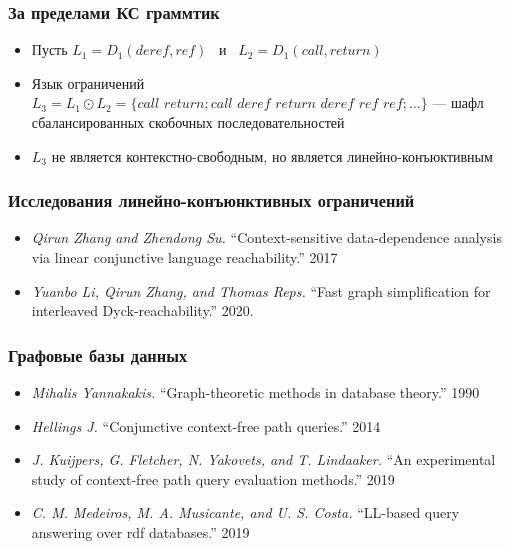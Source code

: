 \documentclass{beamer}
\begin{document}
\begin{frame}[fragile]
  
  \frametitle{За пределами КС граммтик}
  \begin{itemize}
      \item Пусть $L_1 = D_1(\textit{deref}, \textit{ref}) $  \ и \ $ L_2 = D_1(\textit{call}, \textit{return})$ 
      \item Язык ограничений $L_3 = L_1 \odot L_2 = \{\textit{call return}; \textit{call deref return deref ref ref};  \dots\}$ --- шафл сбалансированных скобочных последовательностей
      \item $L_3$ не является контекстно-свободным, но является линейно-конъюктивным
    \end{itemize}

\end{frame}

\begin{frame}[fragile]
  
  \frametitle{Исследования линейно-конъюнктивных ограничений}
  \begin{itemize}
      \item \emph{Qirun Zhang and Zhendong Su.} ``Context-sensitive data-dependence analysis via linear conjunctive language reachability.'' 2017
      \item \emph{Yuanbo Li, Qirun Zhang, and Thomas Reps.} ``Fast graph simplification for interleaved Dyck-reachability.'' 2020.
    \end{itemize}

\end{frame}


\begin{frame}[fragile]
  
  \frametitle{Графовые базы данных}
  \begin{itemize}
    \item \emph{Mihalis Yannakakis.} ``Graph-theoretic methods in database theory.'' 1990
    \item \emph{Hellings J.} ``Conjunctive context-free path queries.'' 2014
    \item \emph{J. Kuijpers, G. Fletcher, N. Yakovets, and T. Lindaaker.} ``An experimental
study of context-free path query evaluation methods.'' 2019
    \item \emph{C. M. Medeiros, M. A. Musicante, and U. S. Costa.} ``LL-based query answering
over rdf databases.'' 2019
  \end{itemize}
\end{frame}
\end{document}
